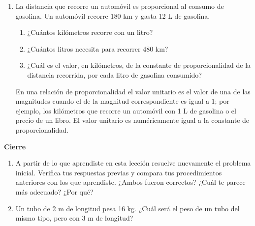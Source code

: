 \begin{enumerate}
    \item La distancia que recorre un automóvil es proporcional al consumo de gasolina.
          Un automóvil recorre 180 km y gasta 12 L de gasolina.
          \begin{enumerate}
              \item ¿Cuántos kilómetros recorre con un litro?
              \item ¿Cuántos litros necesita para recorrer 480 km?
              \item ¿Cuál es el valor, en kilómetros, de la constante de proporcionalidad de la
                    distancia recorrida, por cada litro de gasolina consumido?
          \end{enumerate}
          \begin{boxH}
              En una relación de proporcionalidad el valor unitario es el valor de una de las
              magnitudes cuando el de la magnitud correspondiente es igual a 1; por ejemplo, los
              kilómetros que recorre un automóvil con 1 L de gasolina o el precio de un libro. El
              valor unitario es numéricamente igual a la constante de proporcionalidad.
          \end{boxH}
\end{enumerate}

\begin{boxK}
    \begin{center}\textbf{Cierre}\end{center}

    \begin{enumerate}
        \item A partir de lo que aprendiste en esta lección resuelve nuevamente el problema
              inicial. Verifica tus respuestas previas y compara tus procedimientos anteriores
              con los que aprendiste. ¿Ambos fueron correctos? ¿Cuál te parece más
              adecuado? ¿Por qué?
        \item Un tubo de 2 m de longitud pesa 16 kg. ¿Cuál será el peso de un tubo del mismo
              tipo, pero con 3 m de longitud?
    \end{enumerate}
\end{boxK}

\newpage

